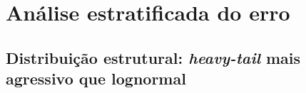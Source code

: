 
%


\section{An\'alise estratificada do erro}
\label{sec:estratificacao}



\subsection{Distribui\c{c}\~ao estrutural: \emph{heavy-tail} mais agressivo que lognormal}
\label{sec:estrat_distribuicao}

